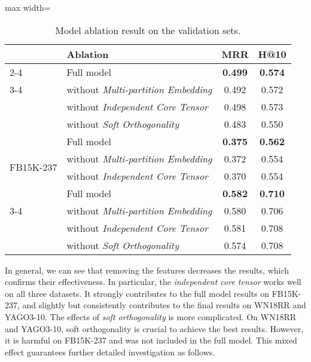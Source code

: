 \documentclass{article}
\theoremstyle{plain}
\theoremstyle{remark}
\begin{document}
\begin{table}[t]
	\centering  
	\begin{adjustbox}{max width=\linewidth}
		\begin{tabular}{@{\extracolsep{-8pt}}llcc}


			& Ablation & MRR & H@10 \\
			\cmidrule{2-4}
			
			\multirow{5}{*}{WN18RR} & Full model & \textbf{0.499} & \textbf{0.574} \\ \cmidrule{3-4}
			& without \textit{Multi-partition Embedding} & 0.492 & 0.572 \\ & without \textit{Independent Core Tensor} & 0.498 & 0.573 \\ & without \textit{Soft Orthogonality} & 0.483 & 0.550 \\ 

\midrule
			
			\multirow{4}{*}{FB15K-237} & Full model & \textbf{0.375} & \textbf{0.562} \\ \cmidrule{3-4}
			& without \textit{Multi-partition Embedding} & 0.372 & 0.554 \\ & without \textit{Independent Core Tensor} & 0.370 & 0.554 \\ 

\midrule
			
			\multirow{5}{*}{YAGO3-10} & Full model & \textbf{0.582} & \textbf{0.710} \\ \cmidrule{3-4}
			& without \textit{Multi-partition Embedding} & 0.580 & 0.706 \\ & without \textit{Independent Core Tensor} & 0.581 & 0.708 \\ & without \textit{Soft Orthogonality} & 0.574 & 0.708 \\ 

\end{tabular}
	\end{adjustbox}
	\caption[]{Model ablation result on the validation sets.}
	\label{tab:ablation_model}
\end{table}

In general, we can see that removing the features decreases the results, which confirms their effectiveness. In particular, the \textit{independent core tensor} works well on all three datasets. It strongly contributes to the full model results on FB15K-237, and slightly but consistently contributes to the final results on WN18RR and YAGO3-10. The effects of \textit{soft orthogonality} is more complicated. On WN18RR and YAGO3-10, soft orthogonality is crucial to achieve the best results. However, it is harmful on FB15K-237 and was not included in the full model. This mixed effect guarantees further detailed investigation as follows. 
\end{document}
